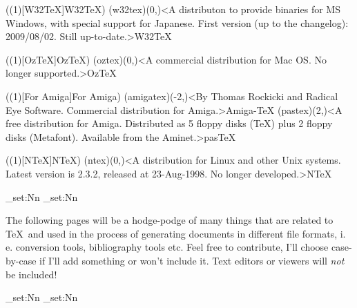 \tograph(\tostruct(1)[W32\TeX]{W32\TeX}){
	\tonode(w32tex)(0,\layer)<A distributon to provide binaries for MS Windows, with special support for Japanese. First version (up to the changelog): 2009/08/02. Still up-to-date.>{W32\TeX}
}

\tograph(\tostruct(1)[OzTeX]{OzTeX}){
	\tonode[\histdistro](oztex)(0,\layer)<A commercial distribution for Mac OS. No longer supported.>{Oz\TeX}
}

\tograph(\tostruct(1)[For Amiga]{For Amiga}){
	\tonode[\histdistro](amigatex)(-2,\layer)<By Thomas Rockicki and Radical Eye Software. Commercial distribution for Amiga.>{Amiga-TeX}
	\tonode[\histdistro](pastex)(2,\layer)<A free distribution for Amiga. Distributed as 5 floppy disks (TeX) plus 2 floppy disks (Metafont). Available from the Aminet.>{pasTeX}
}

\tograph(\tostruct(1)[N\TeX]{N\TeX}){
	\tonode[\histdistro](ntex)(0,\layer)<A distribution for Linux and other Unix systems. Latest version is 2.3.2, released at 23-Aug-1998. No longer developed.>{N\TeX}
}

\newpage
\ExplSyntaxOn
  \dim_set:Nn\pdfpagewidth{13cm}       %
  \dim_set:Nn\pdfpageheight{6cm}
\ExplSyntaxOff
\newpage
{}
\parbox{\textwidth}{\normalsize
The following pages will be a hodge-podge of many things that are related to \TeX\ and used in the process of generating documents in different file formats, i.\,e. conversion tools, bibliography tools etc. Feel free to contribute, I'll choose case-by-case if I'll add something or won't include it. Text editors or viewers will \emph{not} be included!
}
  \restoregeometry
\ExplSyntaxOn
  \dim_set:Nn\pdfpagewidth{21cm}     %
  \dim_set:Nn\pdfpageheight{29.7cm}
\ExplSyntaxOff

